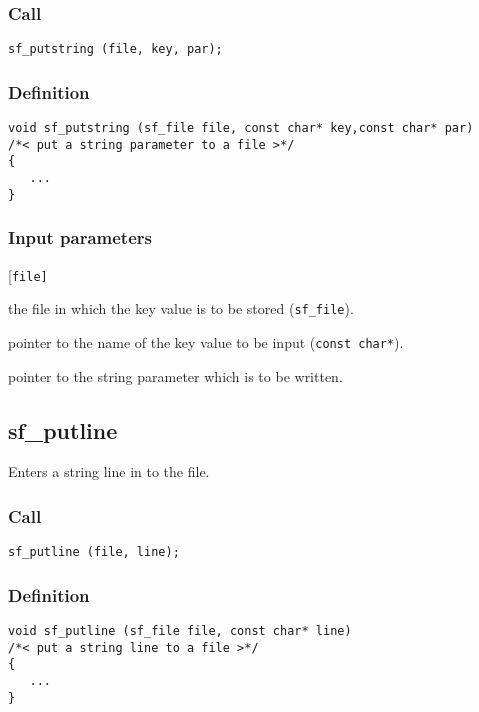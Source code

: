 \subsubsection*{Call}
\begin{verbatim}sf_putstring (file, key, par);\end{verbatim}

\subsubsection*{Definition}
\begin{verbatim}
void sf_putstring (sf_file file, const char* key,const char* par)
/*< put a string parameter to a file >*/
{
   ...
}
\end{verbatim}

\subsubsection*{Input parameters}
\begin{desclist}{\tt }{\quad}[\tt file]
   \setlength\itemsep{0pt}
   \item[file] the file in which the key value is to be stored (\texttt{sf\_file}).
   \item[key]  pointer to the name of the key value to be input (\texttt{const char*}).
   \item[par]  pointer to the string parameter which is to be written.
\end{desclist}




\subsection{{sf\_putline}}
Enters a string line in to the file.  

\subsubsection*{Call}
\begin{verbatim}sf_putline (file, line);\end{verbatim}

\subsubsection*{Definition}
\begin{verbatim}
void sf_putline (sf_file file, const char* line)
/*< put a string line to a file >*/
{
   ...
}
\end{verbatim}

